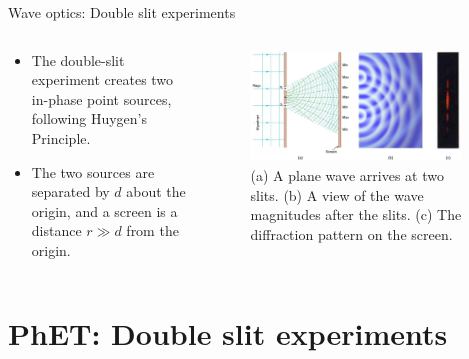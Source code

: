 \documentclass{beamer}
\begin{document}
\begin{frame}{Wave optics: Double slit experiments}
\begin{columns}[T]
\begin{column}{0.35\textwidth}
\small
\begin{itemize}
\item The double-slit experiment creates two in-phase point sources, following Huygen's Principle.
\item The two sources are separated by $d$ about the origin, and a screen is a distance $r \gg d$ from the origin.
\end{itemize}
\end{column}
\begin{column}{0.65\textwidth}
\begin{figure}
\centering
\includegraphics[width=0.95\textwidth]{figures/slit3.png}
\caption{\label{fig:slit3} \footnotesize (a) A plane wave arrives at two slits. (b) A view of the wave magnitudes after the slits.  (c) The diffraction pattern on the screen.}
\end{figure}
\end{column}
\end{columns}
\end{frame}

\section{PhET: Double slit experiments}
\end{document}
